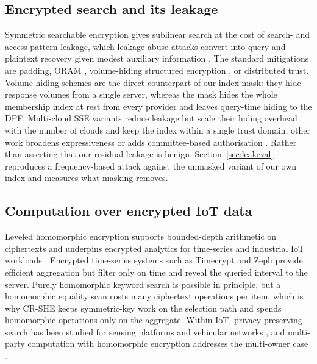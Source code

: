 \documentclass[a4paper,fleqn]{cas-dc}
\begin{document}
\subsection{Encrypted search and its leakage}
Symmetric searchable encryption gives sublinear search at the cost of search-
and access-pattern leakage, which leakage-abuse attacks convert into query and
plaintext recovery given modest auxiliary information
\citep{islam2012access,cash2015leakage,grubbs2017leakage}. The standard
mitigations are padding, ORAM \citep{goldreich1996software}, volume-hiding
structured encryption \citep{kamara2019computationally,patel2019mitigating},
or distributed trust. Volume-hiding schemes are the direct counterpart of our
index mask: they hide response volumes from a single server, whereas the mask
hides the whole membership index at rest from every provider and leaves
query-time hiding to the DPF. Multi-cloud SSE variants
\citep{xu2021privacy,xu2023symmetric} reduce leakage but scale their hiding
overhead with the number of clouds and keep the index within a single trust
domain; other work broadens expressiveness or adds committee-based
authorisation \citep{zhang2024secure,yang2023dynamic,du2022lightweight}.
Rather than asserting that our residual leakage is benign,
Section~\ref{sec:leakeval} reproduces a frequency-based attack against the
unmasked variant of our own index and measures what masking removes.

\subsection{Computation over encrypted IoT data}
Leveled homomorphic encryption \citep{fan2012somewhat,cryptoeprint:2016/421}
supports bounded-depth arithmetic on ciphertexts and underpins encrypted
analytics for time-series and industrial IoT workloads
\citep{halder2022enabling,kamble2024homomorphic}. Encrypted time-series
systems such as Timecrypt \citep{timecrypt} and Zeph \citep{zeph} provide
efficient aggregation but filter only on time and reveal the queried interval
to the server. Purely homomorphic keyword search is possible in principle, but
a homomorphic equality scan costs many ciphertext operations per item, which
is why CR-SHE keeps symmetric-key work on the selection path and spends
homomorphic operations only on the aggregate. Within IoT,
privacy-preserving search has been studied for sensing platforms
\citep{xu2019achieving} and vehicular networks \citep{wu2024distributed}, and
multi-party computation with homomorphic encryption addresses the multi-owner
case \citep{verma2025secure}.
\end{document}
